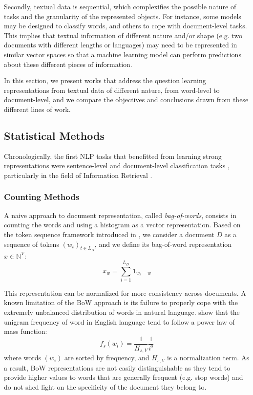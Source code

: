 Secondly, textual data is sequential, which complexifies the possible nature of tasks and the granularity of the represented objects. For instance, some models may be designed to classify words, and others to cope with document-level tasks. This implies that textual information of different nature and/or shape (e.g. two documents with different lengths or languages) may need to be represented in similar vector spaces so that a machine learning model can perform predictions about these different pieces of information.


In this section, we present works that address the question learning representations from textual data of different nature, from word-level to document-level, and we compare the objectives and conclusions drawn from these different lines of work.




\subsection{Statistical Methods}

Chronologically, the first NLP tasks that benefitted from learning  strong representations were sentence-level and document-level classification tasks \citep{baharudin2010review}, particularly in the field of Information Retrieval \citep{chowdhury2010introduction}. 

\subsubsection{Counting Methods}

A naive approach to document representation, called \textit{bag-of-words}, consists in counting the words and using a histogram as a vector representation. Based on the token sequence framework introduced in , we consider a document $D$ as a sequence of tokens $(w_t)_{t \in {L_D}}$, and we define its bag-of-word representation $x \in \mathbb{N}^V$:
$$
x_w = \sum_{i=1}^{L_D} \mathbf{1}_{w_i = w}
$$

This representation can be normalized for more consistency across documents. A known limitation of the BoW approach is its failure to properly cope with the extremely unbalanced distribution of words in natural language. \citet{zipf_psycho-biology_1935} show that the unigram frequency of word in English language tend to follow a power law of mass function:
$$
f_s(w_i) = \frac{1}{H_{s, V}} \frac{1}{i^s}
$$
where words $(w_i)$ are sorted by frequency, and $H_{s, V}$ is a normalization term. As a result, BoW representations are not easily distinguishable as they tend to provide higher values to words that are generally frequent (e.g. stop words) and do not shed light on the specificity of the document they belong to.

